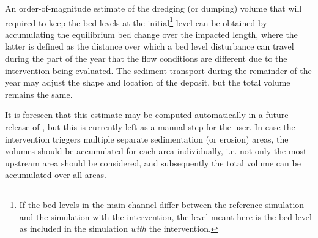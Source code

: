 An order-of-magnitude estimate of the dredging (or dumping) volume that will required to keep the bed levels at the initial\footnote{If the bed levels in the main channel differ between the reference simulation and the simulation with the intervention, the level meant here is the bed level as included in the simulation \emph{with} the intervention.} level can be obtained by accumulating the equilibrium bed change over the impacted length, where the latter is defined as the distance over which a bed level disturbance can travel during the part of the year that the flow conditions are different due to the intervention being evaluated.
The sediment transport during the remainder of the year may adjust the shape and location of the deposit, but the total volume remains the same.

It is foreseen that this estimate may be computed automatically in a future release of \dfmi, but this is currently left as a manual step for the user.
In case the intervention triggers multiple separate sedimentation (or erosion) areas, the volumes should be accumulated for each area individually, i.e. not only the most upstream area should be considered, and subsequently the total volume can be accumulated over all areas.

